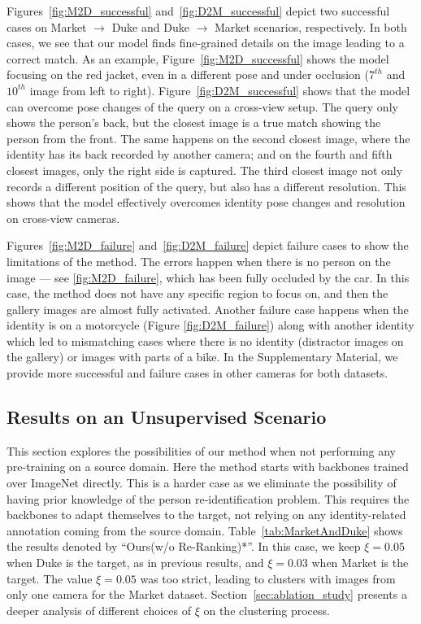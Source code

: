 \documentclass[journal]{IEEEtran}
\begin{document}
Figures~\ref{fig:M2D_successful} and~\ref{fig:D2M_successful} depict two successful cases on Market $\rightarrow$ Duke and Duke $\rightarrow$ Market scenarios, respectively. In both cases, we see that our model finds fine-grained details on the image leading to a correct match.  As an example, Figure~\ref{fig:M2D_successful} shows the model focusing on the red jacket, even in a different pose and under occlusion ($7^{th}$ and $10^{th}$ image from left to right). Figure~\ref{fig:D2M_successful} shows that the model can overcome pose changes of the query on a cross-view setup. The query only shows the person's back, but the closest image is a true match showing the person from the front. The same happens on the second closest image, where the identity has its back recorded by another camera; and on the fourth and fifth closest images, only the right side is captured. The third closest image not only records a different position of the query, but also has a different resolution. This shows that the model effectively overcomes identity pose changes and resolution on cross-view cameras. 

Figures~\ref{fig:M2D_failure} and~\ref{fig:D2M_failure} depict failure cases to show the limitations of the method. The errors happen when there is no person on the image --- see \ref{fig:M2D_failure}, which has been fully occluded by the car. In this case, the method does not have any specific region to focus on, and then the gallery images are almost fully activated. Another failure case happens when the identity is on a motorcycle (Figure \ref{fig:D2M_failure}) along with another identity which led to mismatching cases where there is no identity (distractor images on the gallery) or images with parts of a bike. In the  Supplementary Material, we provide more successful and failure cases in other cameras for both datasets.

\subsection{Results on an Unsupervised Scenario} \label{subsec:results_unsupervised}

This section explores the possibilities of our method when not performing any pre-training on a source domain. Here the method starts with backbones trained over ImageNet directly. This is a harder case as we eliminate the possibility of having prior knowledge of the person re-identification problem. This requires the backbones to adapt themselves to the target, not relying on any identity-related annotation coming from the source domain. Table~\ref{tab:MarketAndDuke} shows the results denoted by ``Ours(w/o Re-Ranking)*''. In this case, we keep $\xi = 0.05$ when Duke is the target, as in previous results, and $\xi = 0.03 $ when Market is the target. The value $\xi = 0.05 $ was too strict, leading to clusters with images from only one camera for the Market dataset. Section~\ref{sec:ablation_study} presents a deeper analysis of different choices of $\xi$ on the clustering process. 
\end{document}

